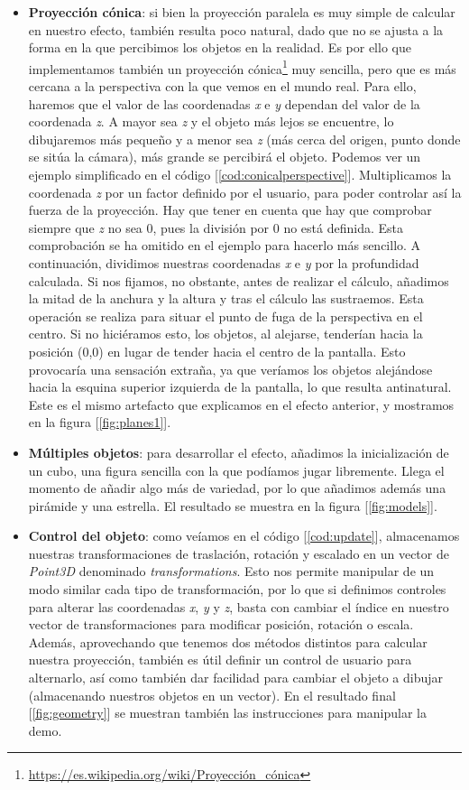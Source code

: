 \begin{itemize}
	\item \textbf{Proyección cónica}: si bien la proyección paralela es muy simple de calcular en nuestro efecto, también resulta poco natural, dado que no se ajusta a la forma en la que percibimos los objetos en la realidad. Es por ello que implementamos también un proyección cónica\footnote{\url{https://es.wikipedia.org/wiki/Proyección_cónica}} muy sencilla, pero que es más cercana a la perspectiva con la que vemos en el mundo real. Para ello, haremos que el valor de las coordenadas \emph{x} e \emph{y} dependan del valor de la coordenada \emph{z}. A mayor sea \emph{z} y el objeto más lejos se encuentre, lo dibujaremos más pequeño y a menor sea \emph{z} (más cerca del origen, punto donde se sitúa la cámara), más grande se percibirá el objeto. Podemos ver un ejemplo simplificado en el código [\ref{cod:conicalperspective}]. Multiplicamos la coordenada \emph{z} por un factor definido por el usuario, para poder controlar así la fuerza de la proyección. Hay que tener en cuenta que hay que comprobar siempre que \emph{z} no sea 0, pues la división por 0 no está definida. Esta comprobación se ha omitido en el ejemplo para hacerlo más sencillo. A continuación, dividimos nuestras coordenadas \emph{x} e \emph{y} por la profundidad calculada. Si nos fijamos, no obstante, antes de realizar el cálculo, añadimos la mitad de la anchura y la altura y tras el cálculo las sustraemos. Esta operación se realiza para situar el punto de fuga de la perspectiva en el centro. Si no hiciéramos esto, los objetos, al alejarse, tenderían hacia la posición (0,0) en lugar de tender hacia el centro de la pantalla. Esto provocaría una sensación extraña, ya que veríamos los objetos alejándose hacia la esquina superior izquierda de la pantalla, lo que resulta antinatural. Este es el mismo artefacto que explicamos en el efecto anterior, y mostramos en la figura [\ref{fig:planes1}].
	\item \textbf{Múltiples objetos}: para desarrollar el efecto, añadimos la inicialización de un cubo, una figura sencilla con la que podíamos jugar libremente. Llega el momento de añadir algo más de variedad, por lo que añadimos además una pirámide y una estrella. El resultado se muestra en la figura [\ref{fig:models}].
	\item \textbf{Control del objeto}: como veíamos en el código [\ref{cod:update}], almacenamos nuestras transformaciones de traslación, rotación y escalado en un vector de \emph{Point3D} denominado \emph{transformations}. Esto nos permite manipular de un modo similar cada tipo de transformación, por lo que si definimos controles para alterar las coordenadas \emph{x}, \emph{y} y \emph{z}, basta con cambiar el índice en nuestro vector de transformaciones para modificar posición, rotación o escala. Además, aprovechando que tenemos dos métodos distintos para calcular nuestra proyección, también es útil definir un control de usuario para alternarlo, así como también dar facilidad para cambiar el objeto a dibujar (almacenando nuestros objetos en un vector). En el resultado final [\ref{fig:geometry}] se muestran también las instrucciones para manipular la demo.
\end{itemize}


